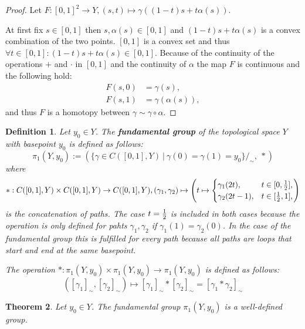 \documentclass{article}
\theoremstyle{break}
\newtheorem{thm}{Theorem}[section]
\theoremstyle{break}
\newtheorem{defin}[thm]{Definition}
\begin{document}
\begin{proof}
  Let $F: [0,1]^2 \to Y, (s, t) \mapsto \gamma((1 - t)s + t\alpha(s))$.

  At first fix $s \in [0,1]$ then $s, \alpha(s) \in [0,1]$ and $(1 - t)s + t\alpha(s)$ is a convex combination of the two points. 
  $[0,1]$ is a convex set and thus $\forall t\in[0,1]: (1 - t)s + t\alpha(s) \in [0,1]$. Because of the continuity of the operations $+$ and $\cdot$ in $[0,1]$ 
  and the continuity of $\alpha$ the map $F$ is continuous and the following hold:
  \begin{align*}
    F(s, 0) &= \gamma(s), \\
    F(s, 1) &= \gamma(\alpha(s)),
  \end{align*}
  and thus $F$ is a homotopy between $\gamma \sim \gamma \circ \alpha$.
\end{proof}

\begin{defin}
  Let $y_0 \in Y$. The \textbf{fundamental group} of the topological space $Y$ with basepoint $y_0$ is defined as follows:
  \begin{equation*}
    \pi_1(Y, y_0) := (\{\gamma \in C([0,1],Y) \: | \: \gamma(0) = \gamma(1) = y_0\}/_{\sim}, \: *)
  \end{equation*}
  where 
  \begin{equation*} 
    *: C([0,1], Y) \times C([0,1], Y) \to C([0,1], Y), (\gamma_1, \gamma_2) \mapsto \left(t \mapsto \begin{cases}
    \gamma_1(2t),   &t \in [0, {1 \over 2}], \\
    \gamma_2(2t-1), &t \in [{1 \over 2}, 1],
  \end{cases}\right)
\end{equation*}
is the concatenation of paths. The case $t = {1\over2}$ is included in both cases because the operation is only defined for pahts $\gamma_1, \gamma_2$ if $\gamma_1(1) = \gamma_2(0)$. 
In the case of the fundamental group this is fulfilled for every path because all paths are loops that start and end at the same basepoint.

The operation $*: \pi_1(Y, y_0) \times \pi_1(Y, y_0) \to \pi_1(Y, y_0)$ is defined as follows:
\begin{equation*}
  ([\gamma_1]_{\sim}, [\gamma_2]_{\sim}) \mapsto [\gamma_1]_{\sim} * [\gamma_2]_{\sim} = [\gamma_1 * \gamma_2]_{\sim}
\end{equation*} 
\end{defin}

\begin{thm}
  Let $y_0 \in Y$. The fundamental group $\pi_1(Y, y_0)$ is a well-defined group. 
\end{thm}
\end{document}
